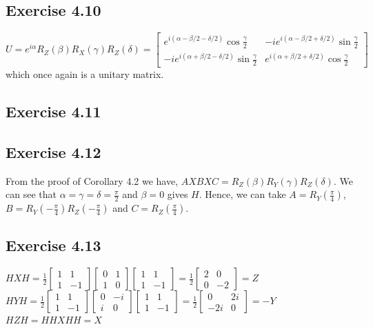 \documentclass[a4paper,12pt]{article}
\begin{document}
\subsection*{Exercise 4.10}
$U=e^{i\alpha}R_Z(\beta)R_X(\gamma)R_Z(\delta)=\begin{bmatrix}
    e^{i(\alpha-\beta/2-\delta/2)}\cos\frac{\gamma}{2} & -ie^{i(\alpha-\beta/2+\delta/2)}\sin\frac{\gamma}{2}\\
    -ie^{i(\alpha+\beta/2-\delta/2)}\sin\frac{\gamma}{2} & e^{i(\alpha+\beta/2+\delta/2)}\cos\frac{\gamma}{2}
\end{bmatrix}$\\
which once again is a unitary matrix.
\subsection*{Exercise 4.11}
\subsection*{Exercise 4.12}
From the proof of Corollary 4.2 we have, $AXBXC=R_Z(\beta)R_Y(\gamma)R_Z(\delta)$. We can see
that $\alpha=\gamma=\delta=\frac{\pi}{2}$ and $\beta=0$ gives $H$. Hence, we can take
$A=R_Y(\frac{\pi}{4})$,$B=R_Y(-\frac{\pi}{4})R_Z(-\frac{\pi}{4})$ and $C=R_Z(\frac{\pi}{4})$.
\subsection*{Exercise 4.13}
$HXH=\frac{1}{2}\begin{bmatrix}
    1&1\\
    1&-1
\end{bmatrix}
\begin{bmatrix}
    0&1\\
    1&0
\end{bmatrix}
\begin{bmatrix}
    1&1\\
    1&-1
\end{bmatrix}=
\frac{1}{2}
\begin{bmatrix}
    2&0\\
    0&-2
\end{bmatrix}=Z$\\
$HYH=\frac{1}{2}\begin{bmatrix}
    1&1\\
    1&-1
\end{bmatrix}
\begin{bmatrix}
    0&-i\\
    i&0
\end{bmatrix}
\begin{bmatrix}
    1&1\\
    1&-1
\end{bmatrix}=
\frac{1}{2}
\begin{bmatrix}
    0&2i\\
    -2i&0
\end{bmatrix}=-Y$
$HZH=HHXHH=X$
\end{document}
